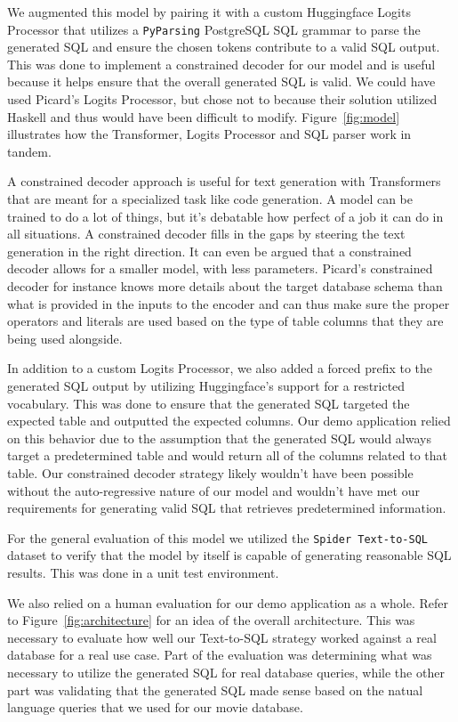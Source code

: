 \documentclass[11pt]{article}
\begin{document}
We augmented this model by pairing it with a custom Huggingface Logits Processor that utilizes a \texttt{PyParsing} PostgreSQL SQL grammar \citep{githubPyparsing} to parse the generated SQL and ensure the chosen tokens contribute to a valid SQL output. This was done to implement a constrained decoder for our model and is useful because it helps ensure that the overall generated SQL is valid. We could have used Picard's Logits Processor, but chose not to because their solution utilized Haskell and thus would have been difficult to modify. Figure~\ref{fig:model} illustrates how the Transformer, Logits Processor and SQL parser work in tandem.

A constrained decoder approach is useful for text generation with Transformers that are meant for a specialized task like code generation. A model can be trained to do a lot of things, but it's debatable how perfect of a job it can do in all situations. A constrained decoder fills in the gaps by steering the text generation in the right direction. It can even be argued that a constrained decoder allows for a smaller model, with less parameters. Picard's constrained decoder for instance knows more details about the target database schema than what is provided in the inputs to the encoder and can thus make sure the proper operators and literals are used based on the type of table columns that they are being used alongside.

In addition to a custom Logits Processor, we also added a forced prefix to the generated SQL output by utilizing Huggingface's support for a restricted vocabulary. This was done to ensure that the generated SQL targeted the expected table and outputted the expected columns. Our demo application relied on this behavior due to the assumption that the generated SQL would always target a predetermined table and would return all of the columns related to that table. Our constrained decoder strategy likely wouldn't have been possible without the auto-regressive nature of our model and wouldn't have met our requirements for generating valid SQL that retrieves predetermined information.

For the general evaluation of this model we utilized the \texttt{Spider Text-to-SQL} dataset \citep{yu2019spider} to verify that the model by itself is capable of generating reasonable SQL results. This was done in a unit test environment.

We also relied on a human evaluation for our demo application as a whole. Refer to Figure~\ref{fig:architecture} for an idea of the overall architecture. This was necessary to evaluate how well our Text-to-SQL strategy worked against a real database for a real use case. Part of the evaluation was determining what was necessary to utilize the generated SQL for real database queries, while the other part was validating that the generated SQL made sense based on the natual language queries that we used for our movie database.
\end{document}
